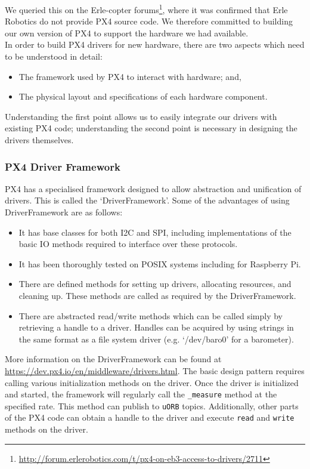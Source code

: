 \documentclass[capstone_report.tex]{subfiles}
\begin{document}
    We queried this on the Erle-copter forums\footnote{\url{http://forum.erlerobotics.com/t/px4-on-eb3-access-to-drivers/2711}}, where it was confirmed that Erle Robotics do not provide PX4 source code. We therefore committed to building our own version of PX4 to support the hardware we had available.\\

    In order to build PX4 drivers for new hardware, there are two aspects which need to be understood in detail:
    \begin{itemize}
        \item The framework used by PX4 to interact with hardware; and,
        \item The physical layout and specifications of each hardware component.
    \end{itemize}

    Understanding the first point allows us to easily integrate our drivers with existing PX4 code; understanding the second point is necessary in designing the drivers themselves.\\

    \subsubsection{PX4 Driver Framework}
    PX4 has a specialised framework designed to allow abstraction and unification of drivers. This is called the `DriverFramework'. Some of the advantages of using DriverFramework are as follows:
    \begin{itemize}
        \item It has base classes for both I2C and SPI, including implementations of the basic IO methods required to interface over these protocols.
        \item It has been thoroughly tested on POSIX systems including for Raspberry Pi.
        \item There are defined methods for setting up drivers, allocating resources, and cleaning up. These methods are called as required by the DriverFramework.
        \item There are abstracted read/write methods which can be called simply by retrieving a handle to a driver. Handles can be acquired by using strings in the same format as a file system driver (e.g. `/dev/baro0' for a barometer).
    \end{itemize}

    More information on the DriverFramework can be found at \url{https://dev.px4.io/en/middleware/drivers.html}. The basic design pattern requires calling various initialization methods on the driver. Once the driver is initialized and started, the framework will regularly call the \texttt{\_measure} method at the specified rate. This method can publish to \texttt{uORB} topics. Additionally, other parts of the PX4 code can obtain a handle to the driver and execute \texttt{read} and \texttt{write} methods on the driver. \\
\end{document}
